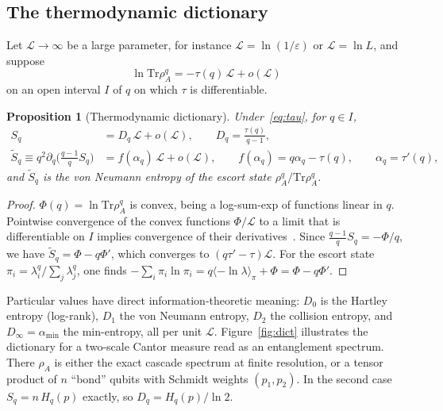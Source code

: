 \documentclass[11pt]{article}
\newtheorem{proposition}{Proposition}[section]
\theoremstyle{definition}\newtheorem{definition}{Definition}[section]
\theoremstyle{remark}\newtheorem*{remark}{Remark}
\newcommand{\Tr}{\mathrm{Tr}}
\newcommand{\cL}{\mathcal{L}}
\begin{document}
\subsection{The thermodynamic dictionary}
Let $\cL\to\infty$ be a large parameter, for instance $\cL=\ln(1/\varepsilon)$ or $\cL=\ln L$, and suppose
\begin{equation}
\ln\Tr\rho_A^q=-\tau(q)\,\cL+o(\cL)
\label{eq:tau}
\end{equation}
on an open interval $I$ of $q$ on which $\tau$ is differentiable.

\begin{proposition}[Thermodynamic dictionary]
\label{prop:dict}
Under~\eqref{eq:tau}, for $q\in I$,
\begin{align}
S_q&=D_q\,\cL+o(\cL),\qquad D_q=\frac{\tau(q)}{q-1},\\
\tilde S_q\equiv q^2\partial_q\Big(\frac{q-1}{q}S_q\Big)&=f(\alpha_q)\,\cL+o(\cL),\qquad
f(\alpha_q)=q\alpha_q-\tau(q),\qquad \alpha_q=\tau'(q),
\end{align}
and $\tilde S_q$ is the von Neumann entropy of the escort state $\rho_A^q/\Tr\rho_A^q$.
\end{proposition}
\begin{proof}
$\Phi(q)=\ln\Tr\rho_A^q$ is convex, being a log-sum-exp of functions linear in $q$. Pointwise convergence of
the convex functions $\Phi/\cL$ to a limit that is differentiable on $I$ implies convergence of their
derivatives~\cite[Thm.~25.7]{Rockafellar}. Since $\frac{q-1}{q}S_q=-\Phi/q$, we have
$\tilde S_q=\Phi-q\Phi'$, which converges to $(q\tau'-\tau)\cL$. For the escort state
$\pi_i=\lambda_i^q/\sum_j\lambda_j^q$, one finds $-\sum_i\pi_i\ln\pi_i=q\langle-\ln\lambda\rangle_\pi+\Phi=\Phi-q\Phi'$.
\end{proof}
Particular values have direct information-theoretic meaning: $D_0$ is the Hartley entropy (log-rank), $D_1$
the von Neumann entropy, $D_2$ the collision entropy, and $D_\infty=\alpha_{\min}$ the min-entropy, all per
unit $\cL$. Figure~\ref{fig:dict} illustrates the dictionary for a two-scale Cantor measure read as an
entanglement spectrum. There $\rho_A$ is either the exact cascade spectrum at finite resolution, or a tensor
product of $n$ ``bond'' qubits with Schmidt weights $(p_1,p_2)$. In the second case $S_q=n\,H_q(p)$ exactly, so
$D_q=H_q(p)/\ln2$.
\end{document}
